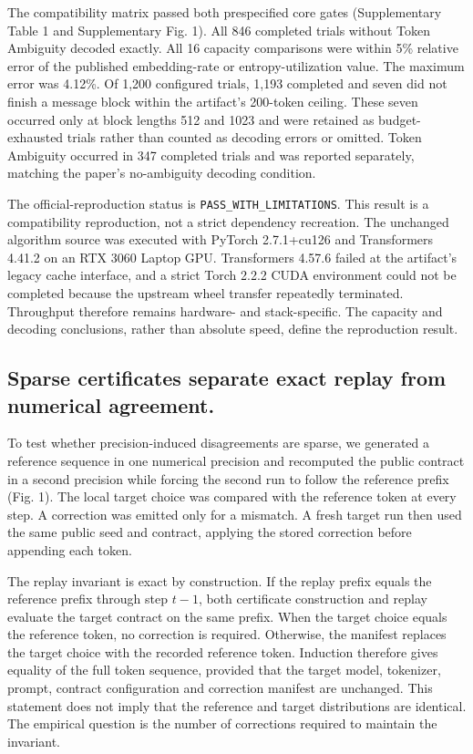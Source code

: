 \documentclass{nature}
\begin{document}
The compatibility matrix passed both prespecified core gates (Supplementary Table 1 and Supplementary Fig. 1). All 846 completed trials without Token Ambiguity decoded exactly. All 16 capacity comparisons were within 5\% relative error of the published embedding-rate or entropy-utilization value. The maximum error was 4.12\%. Of 1,200 configured trials, 1,193 completed and seven did not finish a message block within the artifact's 200-token ceiling. These seven occurred only at block lengths 512 and 1023 and were retained as budget-exhausted trials rather than counted as decoding errors or omitted. Token Ambiguity occurred in 347 completed trials and was reported separately, matching the paper's no-ambiguity decoding condition.

The official-reproduction status is \texttt{PASS\_\allowbreak{}WITH\_\allowbreak{}LIMITATIONS}. This result is a compatibility reproduction, not a strict dependency recreation. The unchanged algorithm source was executed with PyTorch 2.7.1+cu126 and Transformers 4.41.2 on an RTX 3060 Laptop GPU. Transformers 4.57.6 failed at the artifact's legacy cache interface, and a strict Torch 2.2.2 CUDA environment could not be completed because the upstream wheel transfer repeatedly terminated. Throughput therefore remains hardware- and stack-specific. The capacity and decoding conclusions, rather than absolute speed, define the reproduction result.

\subsection{Sparse certificates separate exact replay from numerical agreement.}
To test whether precision-induced disagreements are sparse, we generated a reference sequence in one numerical precision and recomputed the public contract in a second precision while forcing the second run to follow the reference prefix (Fig. 1). The local target choice was compared with the reference token at every step. A correction was emitted only for a mismatch. A fresh target run then used the same public seed and contract, applying the stored correction before appending each token.

The replay invariant is exact by construction. If the replay prefix equals the reference prefix through step \(t-1\), both certificate construction and replay evaluate the target contract on the same prefix. When the target choice equals the reference token, no correction is required. Otherwise, the manifest replaces the target choice with the recorded reference token. Induction therefore gives equality of the full token sequence, provided that the target model, tokenizer, prompt, contract configuration and correction manifest are unchanged. This statement does not imply that the reference and target distributions are identical. The empirical question is the number of corrections required to maintain the invariant.
\end{document}
